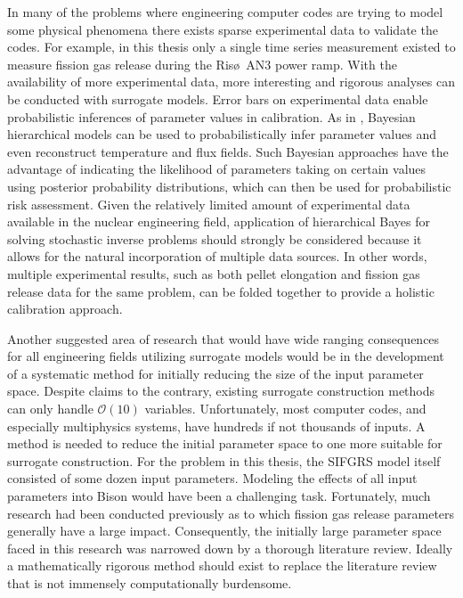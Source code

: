 In many of the problems where engineering computer codes are trying to model some physical phenomena there exists sparse experimental data to validate the codes. For example, in this thesis only a single time series measurement existed to measure fission gas release during the Ris\o~AN3 power ramp. With the availability of more experimental data, more interesting and rigorous analyses can be conducted with surrogate models. Error bars on experimental data enable probabilistic inferences of parameter values in calibration. As in \cite{Wang}, Bayesian hierarchical models can be used to probabilistically infer parameter values and even reconstruct temperature and flux fields. Such Bayesian approaches have the advantage of indicating the likelihood of parameters taking on certain values using posterior probability distributions, which can then be used for probabilistic risk assessment. Given the relatively limited amount of experimental data available in the nuclear engineering field, application of hierarchical Bayes for solving stochastic inverse problems should strongly be considered because it allows for the natural incorporation of multiple data sources. In other words, multiple experimental results, such as both pellet elongation and fission gas release data for the same problem, can be folded together to provide a holistic calibration approach.     

Another suggested area of research that would have wide ranging consequences for all engineering fields utilizing surrogate models would be in the development of a systematic method for initially reducing the size of the input parameter space. Despite claims to the contrary, existing surrogate construction methods can only handle $\mathcal{O}(10)$ variables. Unfortunately, most computer codes, and especially multiphysics systems, have hundreds if not thousands of inputs. A method is needed to reduce the initial parameter space to one more suitable for surrogate construction. For the problem in this thesis, the \ac{SIFGRS} model itself consisted of some dozen input parameters. Modeling the effects of all input parameters into Bison would have been a challenging task. Fortunately, much research had been conducted previously as to which fission gas release parameters generally have a large impact. Consequently, the initially large parameter space faced in this research was narrowed down by a thorough literature review. Ideally a mathematically rigorous method should exist to replace the literature review that is not immensely computationally burdensome.  

